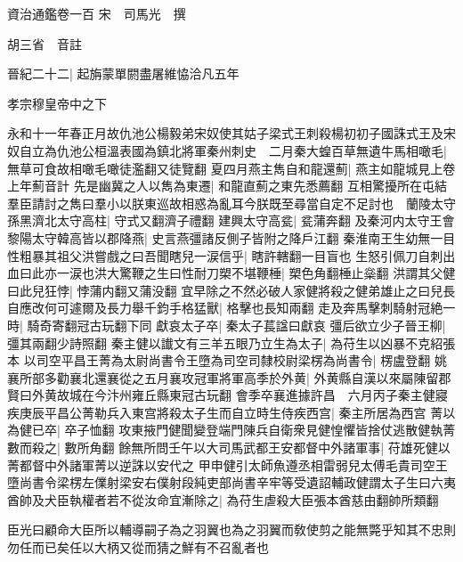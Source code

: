 資治通鑑卷一百
宋　司馬光　撰

胡三省　音註

晉紀二十二|{
	起旃蒙單閼盡屠維恊洽凡五年}


孝宗穆皇帝中之下

永和十一年春正月故仇池公楊毅弟宋奴使其姑子梁式王刺殺楊初初子國誅式王及宋奴自立為仇池公桓溫表國為鎮北將軍秦州刺史　二月秦大蝗百草無遺牛馬相噉毛|{
	無草可食故相噉毛噉徒濫翻又徒覽翻}
夏四月燕主雋自和龍還薊|{
	燕主如龍城見上卷上年薊音計}
先是幽冀之人以雋為東遷|{
	和龍直薊之東先悉薦翻}
互相驚擾所在屯結羣臣請討之雋曰羣小以朕東巡故相惑為亂耳今朕既至尋當自定不足討也　蘭陵太守孫黑濟北太守高柱|{
	守式又翻濟子禮翻}
建興太守高瓫|{
	瓫蒲奔翻}
及秦河内太守王會黎陽太守韓高皆以郡降燕|{
	史言燕彊諸反側子皆附之降戶江翻}
秦淮南王生幼無一目性粗暴其祖父洪嘗戲之曰吾聞瞎兒一涙信乎|{
	瞎許轄翻一目盲也}
生怒引佩刀自刺出血曰此亦一涙也洪大驚鞭之生曰性耐刀槊不堪鞭棰|{
	槊色角翻棰止橤翻}
洪謂其父健曰此兒狂悖|{
	悖蒲内翻又蒲没翻}
宜早除之不然必破人家健將殺之健弟雄止之曰兒長自應改何可遽爾及長力舉千鈞手格猛獸|{
	格擊也長知兩翻}
走及奔馬擊刺騎射冠絶一時|{
	騎奇寄翻冠古玩翻下同}
獻哀太子卒|{
	秦太子萇諡曰獻哀}
彊后欲立少子晉王柳|{
	彊其兩翻少詩照翻}
秦主健以䜟文有三羊五眼乃立生為太子|{
	為苻生以凶暴不克紹張本}
以司空平昌王菁為太尉尚書令王墮為司空司隸校尉梁楞為尚書令|{
	楞盧登翻}
姚襄所部多勸襄北還襄從之五月襄攻冠軍將軍高季於外黄|{
	外黄縣自漢以來屬陳留郡賢曰外黄故城在今汴州雍丘縣東冠古玩翻}
會季卒襄進據許昌　六月丙子秦主健寢疾庚辰平昌公菁勒兵入東宫將殺太子生而自立時生侍疾西宫|{
	秦主所居為西宫}
菁以為健已卒|{
	卒子恤翻}
攻東掖門健聞變登端門陳兵自衛衆見健惶懼皆捨仗逃散健執菁數而殺之|{
	數所角翻}
餘無所問壬午以大司馬武都王安都督中外諸軍事|{
	苻雄死健以菁都督中外諸軍菁以逆誅以安代之}
甲申健引太師魚遵丞相雷弱兒太傅毛貴司空王墮尚書令梁楞左㒒射梁安右僕射段純吏部尚書辛牢等受遺詔輔政健謂太子生曰六夷酋帥及犬臣執權者若不從汝命宜漸除之|{
	為苻生虐殺大臣張本酋慈由翻帥所類翻}


臣光曰顧命大臣所以輔導嗣子為之羽翼也為之羽翼而敎使剪之能無斃乎知其不忠則勿任而已矣任以大柄又從而猜之鮮有不召亂者也

